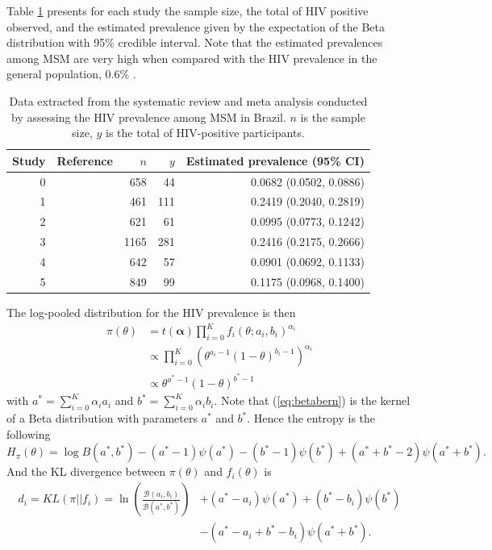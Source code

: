 \documentclass[a4paper, notitlepage, 10pt]{article}
\begin{document}
Table \ref{tbl:hivmsm} presents for each study the sample size, the total of HIV positive observed, and the estimated prevalence given by the expectation of the Beta distribution with 95\% credible interval. 
Note that the estimated prevalences among MSM are very high when compared with the HIV prevalence in the general population, 0.6\% \citep{malta2010hiv}.
\begin{table}[ht]
\caption{Data extracted from the systematic review and meta analysis conducted by \citet{malta2010hiv} assessing the HIV prevalence among MSM in Brazil. $n$ is the sample size, $y$ is the total of HIV-positive participants. }
\label{tbl:hivmsm}
\centering
\begin{tabular}{rlrrr}
  \hline
Study & Reference & $n$ & $y$ & Estimated prevalence (95\% CI)\\ 
  \hline
0 & \cite{tun2008sexual}            &  658 &  44 & 0.0682 (0.0502, 0.0886) \\ 
1 & \cite{barcellos2003prevalence}  &  461 & 111 & 0.2419 (0.2040, 0.2819) \\ 
2 & \cite{carneiro2003determinants} &  621 &  61 & 0.0995 (0.0773, 0.1242) \\ 
3 & \cite{sutmoller2002human}       & 1165 & 281 & 0.2416 (0.2175, 0.2666) \\ 
4 & \cite{BMH2000}                  &  642 &  57 & 0.0901 (0.0692, 0.1133) \\ 
5 & \cite{harrison1999incident}     &  849 &  99 & 0.1175 (0.0968, 0.1400) \\ 
   \hline
\end{tabular}
\end{table}

The log-pooled distribution for the HIV prevalence is then
\begin{align}
\pi(\theta) & = t(\boldsymbol\alpha)\prod_{i=0}^{K}f_i(\theta;a_i,b_i)^{\alpha_i}\\
            & \propto \prod_{i=0}^{K} \left(\theta^{a_i-1}(1-\theta)^{b_i-1} \right)^{\alpha_i}\\
\label{eq:betabern}
&\propto \theta^{a^*-1}(1-\theta)^{b^*-1}
\end{align}
with $a^* =\sum_{i=0}^{K}\alpha_ia_i$ and $b^* = \sum_{i=0}^{K}\alpha_ib_i$.
Note that (\ref{eq:betabern}) is the kernel of a Beta distribution with parameters $a^*$ and $b^*$. Hence the entropy is the following
\begin{equation}
 \label{eq:entropybeta}
 H_{\pi}(\theta) = \log B(a^*,b^*) - (a^*-1)\psi(a^*) - (b^*-1)\psi(b^*) + (a^*+b^* -2)\psi(a^*+b^*).
\end{equation}
And the KL divergence between $\pi(\theta)$ and $f_i(\theta)$  is
\begin{equation}
\begin{split}
 \label{eq:KLbeta}
 d_i = KL(\pi || f_i) = \ln\left(\frac{\mathcal{B}(a_i, b_i)}{\mathcal{B}(a^*, 
b^*)}\right) & + (a^* - a_i) \psi(a^*)+ (b^* - b_i)\psi(b^*) \\
 &- (a^*-a_i + b^* - b_i)\psi(a^*+b^*).
\end{split}
\end{equation}
\end{document}
